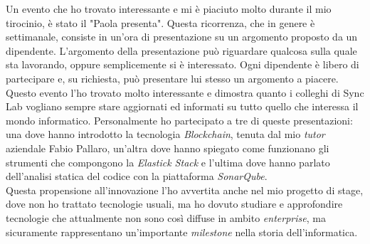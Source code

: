Un evento che ho trovato interessante e mi è piaciuto molto durante il mio tirocinio, è stato il "Paola presenta". 
Questa ricorrenza, che in genere è settimanale, consiste in un'ora di presentazione su un argomento proposto da un dipendente. L'argomento della presentazione può riguardare qualcosa sulla quale sta lavorando, oppure semplicemente si è interessato. 
Ogni dipendente è libero di partecipare e, su richiesta, può presentare lui stesso un argomento a piacere. Questo evento l'ho trovato molto interessante e dimostra quanto i colleghi di Sync Lab vogliano sempre stare aggiornati ed informati su tutto quello che interessa il mondo informatico. 
Personalmente ho partecipato a tre di queste presentazioni: una dove hanno introdotto la tecnologia \textit{Blockchain}, tenuta dal mio \textit{tutor} aziendale Fabio Pallaro, un'altra dove hanno spiegato come funzionano gli strumenti che compongono la \textit{Elastick Stack} e l'ultima dove hanno parlato dell'analisi statica del codice con la piattaforma \textit{SonarQube}. \\

Questa propensione all'innovazione l'ho avvertita anche nel mio progetto di stage, dove non ho trattato tecnologie usuali, ma ho dovuto studiare e approfondire tecnologie che attualmente non sono così diffuse in ambito \textit{enterprise}, ma sicuramente rappresentano un'importante \textit{milestone} nella storia dell'informatica.